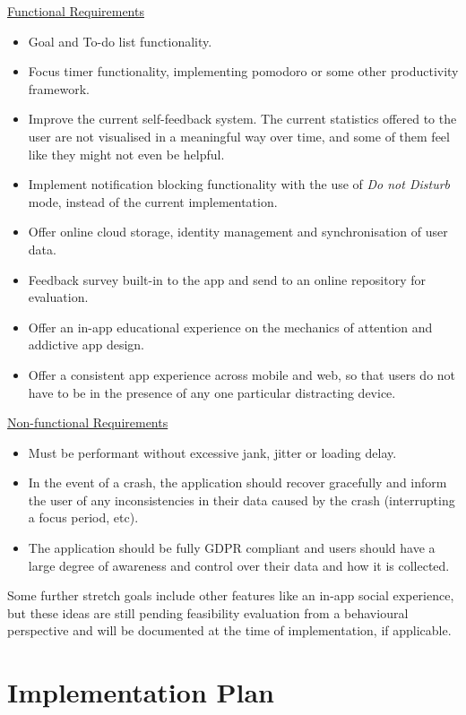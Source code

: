 \underline{Functional Requirements}
\begin{itemize}
    \item Goal and To-do list functionality.
    \item Focus timer functionality, implementing pomodoro or some other productivity framework.
    \item Improve the current self-feedback system. The current statistics offered to the user are not visualised in a meaningful way over time, and some of them feel like they might not even be helpful.
    \item Implement notification blocking functionality with the use of \textit{Do not Disturb} mode, instead of the current implementation.
    \item Offer online cloud storage, identity management and synchronisation of user data.
    \item Feedback survey built-in to the app and send to an online repository for evaluation.
    \item Offer an in-app educational experience on the mechanics of attention and addictive app design.
    \item Offer a consistent app experience across mobile and web, so that users do not have to be in the presence of any one particular distracting device.
\end{itemize}

\underline{Non-functional Requirements}
\begin{itemize}
    \item Must be performant without excessive jank, jitter or loading delay.
    \item In the event of a crash, the application should recover gracefully and inform the user of any inconsistencies in their data caused by the crash (interrupting a focus period, etc).
    \item The application should be fully GDPR compliant and users should have a large degree of awareness and control over their data and how it is collected.
\end{itemize}

Some further stretch goals include other features like an in-app social experience, but these ideas are still pending feasibility evaluation from a behavioural perspective and will be documented at the time of implementation, if applicable.

\section{Implementation Plan}
